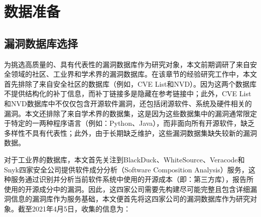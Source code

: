 \section{数据准备}\label{sec:preparation}
\subsection{漏洞数据库选择}
为挑选高质量的、具有代表性的漏洞数据库作为研究对象，本文前期调研了来自安全领域的社区、工业界和学术界的漏洞数据库。在该章节的经验研究工作中，本文首先排除了来自安全社区的数据库（例如，CVE List和NVD）。因为这两个数据库不提供结构化的补丁信息，而补丁链接多是隐藏在参考链接中；此外，CVE List和NVD数据库中不仅仅包含开源软件漏洞，还包括闭源软件、系统及硬件相关的漏洞。本文还排除了来自学术界的数据集\cite{ponta2019manually,fan2020ac,jimenez2018enabling,gkortzis2018vulinoss,namrud2019androvul,li2017large,liu2020large,antal2020exploring}，这是因为这些数据集中的漏洞通常限定于特定的一两种程序语言（例如：Python、Java），而非面向所有开源软件，缺乏多样性不具有代表性；此外，由于长期缺乏维护，这些漏洞数据集缺失较新的漏洞数据。


对于工业界的数据库，本文首先关注到BlackDuck\cite{blackduck}、WhiteSource\cite{whitesource}、Veracode\cite{veracode}和Snyk\cite{snyk}四家安全公司提供软件成分分析（Software Composition Analysis）服务，这种服务通过识别并分析当前软件系统中使用的开源成本（即：第三方库），报告所使用的开源成分中的漏洞。因此，这四家公司需要先构建尽可能完整且包含详细漏洞信息的漏洞库作为服务基础，本文便首先将这四家公司的漏洞数据库作为研究对象。截至2021年4月5日，收集的信息为：

